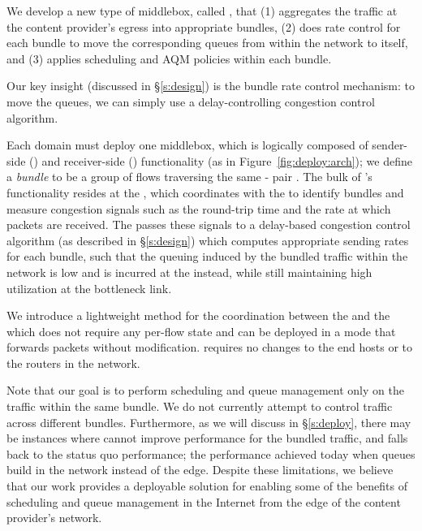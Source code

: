 
We develop a new type of middlebox, called \name, that (1) aggregates the traffic at the content provider's egress into appropriate bundles, (2) does rate control for each bundle to move the corresponding queues from within the network to itself, and (3) applies scheduling and AQM policies within each bundle. 

Our key insight (discussed in \S\ref{s:design}) is the bundle rate control mechanism: to move the queues, we can simply use a delay-controlling congestion control algorithm. 

Each domain must deploy one middlebox, which is logically composed of sender-side (\inbox) and receiver-side (\outbox) functionality (as in Figure~\ref{fig:deploy:arch});
we define a \emph{bundle} to be a group of flows traversing the same \inbox{}-\outbox{} pair .
The bulk of \name's functionality resides at the \inbox, which coordinates with the \outbox to identify bundles and measure congestion signals such as the round-trip time and the rate at which packets are received.
The \inbox passes these signals to a delay-based congestion control algorithm (as described in \S\ref{s:design}) which computes appropriate sending rates for each bundle, such that the queuing induced by the bundled traffic within the network is low and is incurred at the \inbox instead, while still maintaining high utilization at the bottleneck link.
 
We introduce a lightweight method for the coordination between the \inbox and the \outbox which does not require any per-flow state and can be deployed in a mode that forwards packets without modification.  \name requires no changes to the end hosts or to the routers in the network.
 
Note that our goal is to perform scheduling and queue management only on the traffic within the same bundle. We do not currently attempt to control traffic across different bundles. 
Furthermore, as we will discuss in \S\ref{s:deploy}, there may be instances where \name cannot improve performance for the bundled traffic, and falls back to the status quo performance; \ie the performance achieved today when queues build in the network instead of the edge. 
Despite these limitations, we believe that our work provides a deployable solution for enabling some of the benefits of scheduling and queue management in the Internet from the edge of the content provider's network.
 
